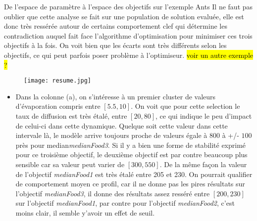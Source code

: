 \begin{framewithtitle}[]{De l'espace de paramètre à l'espace des objectifs sur l'exemple Ants }
Il ne faut pas oublier que cette analyse se fait sur une population de solution evaluée, elle est donc très ressérée autour de certains comportement clef qui détermine les contradiction auquel fait face l'algorithme d'optimisation pour minimiser ces trois objectifs à la fois. On voit bien que les écarts sont très différents selon les objectifs, ce qui peut parfois poser problème à l'optimiseur. \hl{voir un autre exemple ?}

\begin{figure}[H]
	 \centering
	 	\texttt{[image: resume.jpg]}
\end{figure}

\begin{itemize}[noitemsep,nolistsep]
	\item Dans la colonne (a), on s'intéresse à un premier cluster de valeurs d'évaporation compris entre $[5.5, 10]$. On voit que pour cette selection le taux de diffusion est très étalé, entre $[20, 80]$, ce qui indique le peu d'impact de celui-ci dans cette dynamique. Quelque soit cette valeur dans cette intervale là, le modèle arrive toujours proche de valeurs égale à $800$ à +/- $100$ près pour median\textit{medianFood3}. Si il y a bien une forme de stabilité exprimé pour ce troisième objectif, le deuxième objectif est par contre beaucoup plus sensible car sa valeur peut varier de $[300, 550]$. De la même façon la valeur de l'objectif \textit{medianFood1} est très étalé entre 205 et 230. On pourrait qualifier de comportement moyen ce profil, car il ne donne pas les pires résultats sur l'objectif \textit{medianFood3}, il donne des résultats assez resséré entre $[200, 230]$ sur l'objectif \textit{medianFood1}, par contre pour l'objectif \textit{medianFood2}, c'est moins clair, il semble y'avoir un effet de seuil.

\end{itemize}
\end{framewithtitle}
